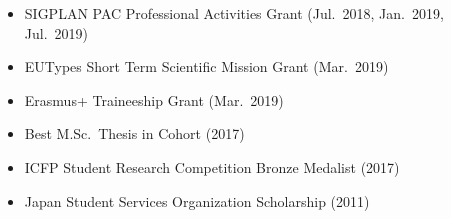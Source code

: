 
\nocite{Kokke20NovMFSBath,Kokke20OctLSDLab,Kokke19MayShamelessPlug,Kokke19AprBehAPI,Kokke19MarDIKU,Kokke18OctKU}
\printbibliography%
[heading=pubtype,title={\printinfo{\faCommentsO}{Invited Talks}},type=performance]

\begin{itemize}
\item SIGPLAN PAC Professional Activities Grant (Jul.\ 2018, Jan.\ 2019, Jul.\ 2019)
\item EUTypes Short Term Scientific Mission Grant (Mar.\ 2019)
\item Erasmus+ Traineeship Grant (Mar.\ 2019)
\item Best M.Sc.\ Thesis in Cohort (2017)
\item ICFP Student Research Competition Bronze Medalist (2017)
\item Japan Student Services Organization Scholarship (2011)
\end{itemize}





